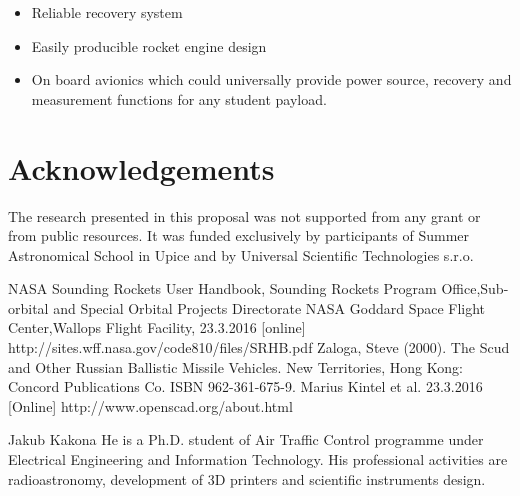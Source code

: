 \documentclass{poster16}
\begin{document}
\begin{itemize}
\item Reliable recovery system
\item Easily producible rocket engine design  
\item On board avionics which could universally provide power source, recovery and measurement functions for any student payload. 
\end{itemize}

\section*{Acknowledgements}

The research presented in this proposal was not supported from any grant or from public resources. It was funded exclusively by participants of Summer Astronomical School in Upice and by Universal Scientific Technologies s.r.o. 

\begin{thebibliography}{9}
NASA Sounding Rockets User Handbook, Sounding Rockets Program Office,Sub-orbital and Special Orbital Projects Directorate
NASA Goddard Space Flight Center,Wallops Flight Facility, 23.3.2016 [online] http://sites.wff.nasa.gov/code810/files/SRHB.pdf
Zaloga, Steve (2000). The Scud and Other Russian Ballistic Missile Vehicles. New Territories, Hong Kong: Concord Publications Co. ISBN 962-361-675-9.
Marius Kintel et al.  23.3.2016 [Online]
http://www.openscad.org/about.html
\end{thebibliography}


\begin{authorcv}{Jakub Kakona}
He is a Ph.D. student of  Air Traffic Control programme under Electrical Engineering and Information Technology. His professional activities are radioastronomy, development of 3D printers and scientific instruments design. 
\end{authorcv}
\end{document}
